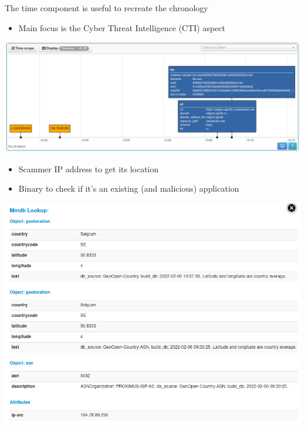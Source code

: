 \begin{frame}
    The time component is useful to recreate the chronology
    \begin{itemize}
        \item Main focus is the Cyber Threat Intelligence (CTI) aspect
    \end{itemize}
    \includegraphics[width=1.0\linewidth]{pictures/case1/timeline.png}
\end{frame}

\begin{frame}
    \begin{itemize}
        \item Scammer IP address to get its location
        \item Binary to check if it's an existing (and malicious) application
    \end{itemize}
    \includegraphics[width=1.0\linewidth]{pictures/case1/enrichment.png}
\end{frame}

